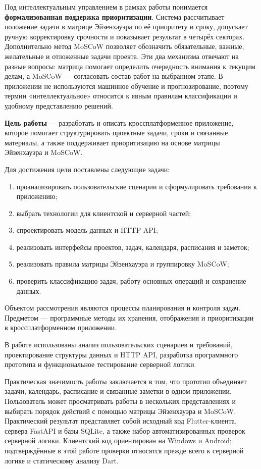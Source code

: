 \documentclass[14pt,a4paper]{extarticle}
\begin{document}
Под интеллектуальным управлением в рамках работы понимается \textbf{формализованная поддержка приоритизации}. Система рассчитывает положение задачи в матрице Эйзенхауэра по её приоритету и сроку, допускает ручную корректировку срочности и показывает результат в четырёх секторах. Дополнительно метод MoSCoW позволяет обозначить обязательные, важные, желательные и отложенные задачи проекта. Эти два механизма отвечают на разные вопросы: матрица помогает определить очередность внимания к текущим делам, а MoSCoW --- согласовать состав работ на выбранном этапе. В приложении не используются машинное обучение и прогнозирование, поэтому термин «интеллектуальное» относится к явным правилам классификации и удобному представлению решений.

\textbf{Цель работы} --- разработать и описать кроссплатформенное приложение, которое помогает структурировать проектные задачи, сроки и связанные материалы, а также поддерживает приоритизацию на основе матрицы Эйзенхауэра и MoSCoW.

Для достижения цели поставлены следующие задачи:
\begin{enumerate}
\item проанализировать пользовательские сценарии и сформулировать требования к приложению;
\item выбрать технологии для клиентской и серверной частей;
\item спроектировать модель данных и HTTP API;
\item реализовать интерфейсы проектов, задач, календаря, расписания и заметок;
\item реализовать правила матрицы Эйзенхауэра и группировку MoSCoW;
\item проверить классификацию задач, работу основных операций и сохранение данных.
\end{enumerate}

Объектом рассмотрения являются процессы планирования и контроля задач. Предметом --- программные методы их хранения, отображения и приоритизации в кроссплатформенном приложении.

В работе использованы анализ пользовательских сценариев и требований, проектирование структуры данных и HTTP API, разработка программного прототипа и функциональное тестирование серверной логики.

Практическая значимость работы заключается в том, что прототип объединяет задачи, календарь, расписание и связанные заметки в одном приложении. Пользователь может просматривать работы в нескольких представлениях и выбирать порядок действий с помощью матрицы Эйзенхауэра и MoSCoW. Практический результат представляет собой исходный код Flutter-клиента, сервера FastAPI и базы SQLite, а также набор автоматизированных проверок серверной логики. Клиентский код ориентирован на Windows и Android; подтверждённые в этой работе проверки относятся прежде всего к серверной логике и статическому анализу Dart.
\end{document}
